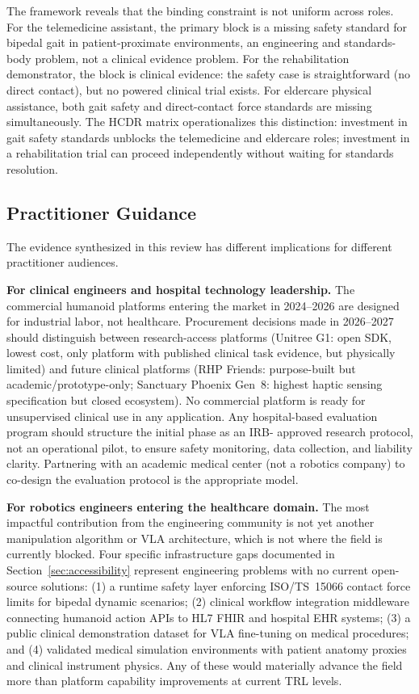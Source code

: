 The framework reveals that the binding constraint is not uniform across roles.
For the telemedicine assistant, the primary block is a missing safety standard for
bipedal gait in patient-proximate environments, an engineering and standards-body
problem, not a clinical evidence problem. For the rehabilitation demonstrator, the
block is clinical evidence: the safety case is straightforward (no direct contact),
but no powered clinical trial exists. For eldercare physical assistance, both gait
safety and direct-contact force standards are missing simultaneously. The HCDR
matrix operationalizes this distinction: investment in gait safety standards
unblocks the telemedicine and eldercare roles; investment in a rehabilitation
trial can proceed independently without waiting for standards resolution.

\subsection{Practitioner Guidance}
\label{sec:practitioners}

The evidence synthesized in this review has different implications for different
practitioner audiences.

\textbf{For clinical engineers and hospital technology leadership.} The commercial
humanoid platforms entering the market in 2024--2026 are designed for industrial
labor, not healthcare. Procurement decisions made in 2026--2027 should distinguish
between research-access platforms (Unitree G1: open SDK, lowest cost, only
platform with published clinical task evidence, but physically limited) and future
clinical platforms (RHP Friends: purpose-built but academic/prototype-only; Sanctuary
Phoenix Gen~8: highest haptic sensing specification but closed ecosystem). No
commercial platform is ready for unsupervised clinical use in any application.
Any hospital-based evaluation program should structure the initial phase as an IRB-
approved research protocol, not an operational pilot, to ensure safety monitoring,
data collection, and liability clarity. Partnering with an academic medical center
(not a robotics company) to co-design the evaluation protocol is the appropriate
model.

\textbf{For robotics engineers entering the healthcare domain.} The most impactful
contribution from the engineering community is not yet another manipulation
algorithm or VLA architecture, which is not where the field is currently
blocked. Four specific
infrastructure gaps documented in Section~\ref{sec:accessibility} represent
engineering problems with no current open-source solutions: (1) a runtime safety
layer enforcing ISO/TS~15066 contact force limits for bipedal dynamic scenarios;
(2) clinical workflow integration middleware connecting humanoid action APIs to
HL7 FHIR and hospital EHR systems; (3) a public clinical demonstration dataset
for VLA fine-tuning on medical procedures; and (4) validated medical simulation
environments with patient anatomy proxies and clinical instrument physics. Any
of these would materially advance the field more than platform capability
improvements at current TRL levels.

